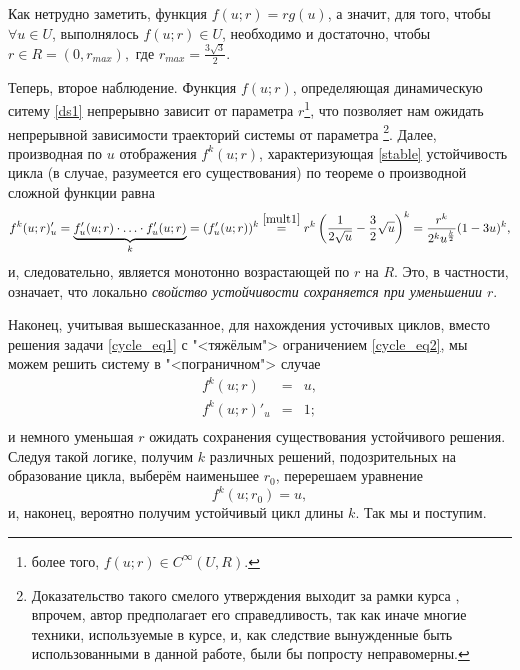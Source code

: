 \documentclass[oneside,final,12pt]{article}
\theoremstyle{plain}
\theoremstyle{remark}
\theoremstyle{definition}
\theoremstyle{plain}
\begin{document}
 	Как нетрудно заметить, функция \(f(u;r) = rg(u)\), а значит, для того, чтобы \(\forall u \in U\), выполнялось \(f(u;r) \in U\), необходимо и достаточно, чтобы \(r \in R = \left(0,r_{max}\right), \text{ где } r_{max} = \frac{3\sqrt{3}}{2}\).
	
	\bigskip
	Теперь, второе наблюдение. Функция \(f(u;r)\), определяющая динамическую ситему \eqref{ds1} непрерывно зависит от параметра \(r\)\footnote{более того, \(f(u;r) \in C^{\infty}(U,R)\).}, что позволяет нам ожидать непрерывной зависимости траекторий системы от параметра \footnote{Доказательство такого смелого утверждения выходит за рамки курса \cite{KURS}, впрочем, автор предполагает его  справедливость, так как иначе многие техники, используемые в курсе, и, как следствие вынужденные быть использованными  в данной работе, были бы попросту неправомерны.}. Далее, производная по \(u\) отображения  \(f^k(u;r)\), характеризующая \eqref{stable} устойчивость цикла (в случае, разумеется его существования) по теореме о производной сложной функции равна 
	\[ f^k(u;r)'_u = \underbrace{f_u'(u;r) \cdot \ldots \cdot f_u'(u;r)}_{k} = (f_u'(u;r))^k \stackrel{\eqref{mult1}}{=} r^k \left( \frac{1}{2\sqrt{u}} - \frac{3}{2}\sqrt{u} \right)^k = \frac{r^k}{2^k u^{\frac{k}{2}}}(1-3u)^k,\]
	и, следовательно, является монотонно возрастающей по \(r\) на \(R\). Это, в частности, означает, что локально \emph{свойство устойчивости сохраняется при уменьшении \(r\)}.

	Наконец, учитывая вышесказанное, для нахождения усточивых циклов, вместо решения задачи \eqref{cycle_eq1} с "<тяжёлым"> ограничением \eqref{cycle_eq2}, мы можем решить систему в "<пограничном"> случае
	\begin{equation} \begin{array}{rcl} \label{cycle_eq_sys}
		f^k(u;r) &=& u,\\
		f^k(u;r)'_u &=& 1;\\
	\end{array} \end{equation}
и немного уменьшая \(r\) ожидать сохранения существования устойчивого решения. Следуя такой логике, получим \(k\) различных решений, подозрительных на образование цикла, выберём наименьшее \(r_0\), перерешаем уравнение 
	\[f^k(u;r_0) = u,\]
и, наконец, вероятно получим устойчивый цикл длины \(k\). Так мы и поступим.
\end{document}
